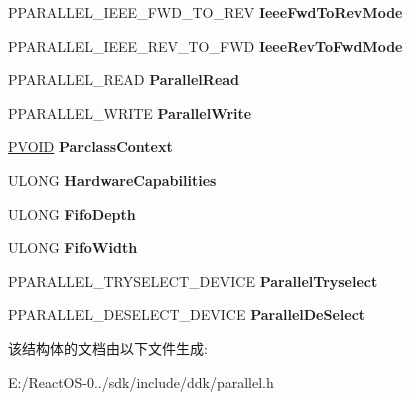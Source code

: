 \begin{DoxyCompactItemize}
\item 
\mbox{\label{struct___p_a_r_c_l_a_s_s___i_n_f_o_r_m_a_t_i_o_n_a3ea5a6d96ba283ced9f2d8166caf90b0}} 
P\+P\+A\+R\+A\+L\+L\+E\+L\+\_\+\+I\+E\+E\+E\+\_\+\+F\+W\+D\+\_\+\+T\+O\+\_\+\+R\+EV {\bfseries Ieee\+Fwd\+To\+Rev\+Mode}
\item 
\mbox{\label{struct___p_a_r_c_l_a_s_s___i_n_f_o_r_m_a_t_i_o_n_a03dd03c6ed4a64b7178259aff82fac39}} 
P\+P\+A\+R\+A\+L\+L\+E\+L\+\_\+\+I\+E\+E\+E\+\_\+\+R\+E\+V\+\_\+\+T\+O\+\_\+\+F\+WD {\bfseries Ieee\+Rev\+To\+Fwd\+Mode}
\item 
\mbox{\label{struct___p_a_r_c_l_a_s_s___i_n_f_o_r_m_a_t_i_o_n_a7226c633fd89e3338c74a541a935378e}} 
P\+P\+A\+R\+A\+L\+L\+E\+L\+\_\+\+R\+E\+AD {\bfseries Parallel\+Read}
\item 
\mbox{\label{struct___p_a_r_c_l_a_s_s___i_n_f_o_r_m_a_t_i_o_n_a11939f0519f6a1e6b4d2a72c5c0d67a8}} 
P\+P\+A\+R\+A\+L\+L\+E\+L\+\_\+\+W\+R\+I\+TE {\bfseries Parallel\+Write}
\item 
\mbox{\label{struct___p_a_r_c_l_a_s_s___i_n_f_o_r_m_a_t_i_o_n_aa60fe812182fb7c63f1d3462f1e7d7d7}} 
\hyperlink{interfacevoid}{P\+V\+O\+ID} {\bfseries Parclass\+Context}
\item 
\mbox{\label{struct___p_a_r_c_l_a_s_s___i_n_f_o_r_m_a_t_i_o_n_adabcb7b45e713fb929cb0335ea3136b9}} 
U\+L\+O\+NG {\bfseries Hardware\+Capabilities}
\item 
\mbox{\label{struct___p_a_r_c_l_a_s_s___i_n_f_o_r_m_a_t_i_o_n_a503b5127e2cd52487bdc30be327c4e3a}} 
U\+L\+O\+NG {\bfseries Fifo\+Depth}
\item 
\mbox{\label{struct___p_a_r_c_l_a_s_s___i_n_f_o_r_m_a_t_i_o_n_a23fc16e8d10b2e243f6dbf3d56002a79}} 
U\+L\+O\+NG {\bfseries Fifo\+Width}
\item 
\mbox{\label{struct___p_a_r_c_l_a_s_s___i_n_f_o_r_m_a_t_i_o_n_a23534b01a3df270a317d52951cfda506}} 
P\+P\+A\+R\+A\+L\+L\+E\+L\+\_\+\+T\+R\+Y\+S\+E\+L\+E\+C\+T\+\_\+\+D\+E\+V\+I\+CE {\bfseries Parallel\+Tryselect}
\item 
\mbox{\label{struct___p_a_r_c_l_a_s_s___i_n_f_o_r_m_a_t_i_o_n_a16bbd6a26dc09171ab734822c3ac6133}} 
P\+P\+A\+R\+A\+L\+L\+E\+L\+\_\+\+D\+E\+S\+E\+L\+E\+C\+T\+\_\+\+D\+E\+V\+I\+CE {\bfseries Parallel\+De\+Select}
\end{DoxyCompactItemize}


该结构体的文档由以下文件生成\+:\begin{DoxyCompactItemize}
\item 
E\+:/\+React\+O\+S-\/0../sdk/include/ddk/parallel.\+h\end{DoxyCompactItemize}
